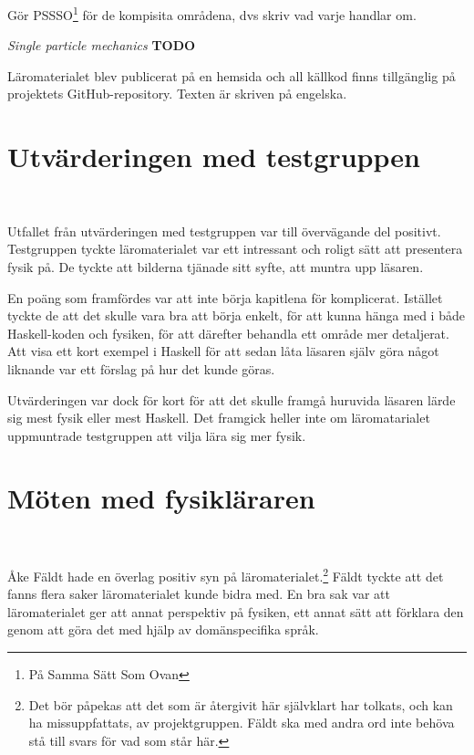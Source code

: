 \begin{draft}
Gör PSSSO\footnote{På Samma Sätt Som Ovan} för de kompisita områdena, dvs skriv
vad varje handlar om.

\textit{Single particle mechanics} \textbf{TODO}

Läromaterialet blev publicerat på en hemsida\cite{LYAP} och all källkod finns
tillgänglig på projektets GitHub-repository.\cite{LYAP_repo} Texten är skriven
på engelska.

%
%
%

\section{Utvärderingen med testgruppen}~\label{sec:res_test}

Utfallet från utvärderingen med testgruppen var till övervägande del positivt.
Testgruppen tyckte läromaterialet var ett intressant och roligt sätt att
presentera fysik på. De tyckte att bilderna tjänade sitt syfte, att muntra upp
läsaren. 

En poäng som framfördes var att inte börja kapitlena för komplicerat. Istället
tyckte de att det skulle vara bra att börja enkelt, för att kunna hänga med i
både Haskell-koden och fysiken, för att därefter behandla ett område mer
detaljerat. Att visa ett kort exempel i Haskell för att sedan låta läsaren själv
göra något liknande var ett förslag på hur det kunde göras.

Utvärderingen var dock för kort för att det skulle framgå huruvida läsaren lärde
sig mest fysik eller mest Haskell. Det framgick heller inte om läromatarialet
uppmuntrade testgruppen att vilja lära sig mer fysik.

\section{Möten med fysikläraren}~\label{sec:res_ake}

Åke Fäldt hade en överlag positiv syn på läromaterialet.\footnote{Det bör
påpekas att det som är återgivit här självklart har tolkats, och kan ha
missuppfattats, av projektgruppen. Fäldt ska med andra ord inte behöva stå till
svars för vad som står här.} Fäldt tyckte att det fanns flera saker
läromaterialet kunde bidra med. En bra sak var att läromaterialet ger att annat
perspektiv på fysiken, ett annat sätt att förklara den genom att göra det med
hjälp av domänspecifika språk.


\end{draft}
